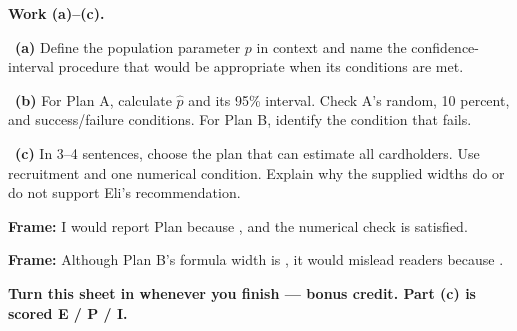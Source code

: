 \documentclass[11pt]{article}
\begin{document}
\newpage
\textbf{Work (a)--(c).}\par\smallskip

~\textbf{(a)} Define the population parameter $p$ in context and name the confidence-interval procedure that would be appropriate when its conditions are met.\par
\workspace{0.7in}

~\textbf{(b)} For Plan A, calculate $\hat p$ and its 95\% interval. Check A's random, 10 percent, and success/failure conditions. For Plan B, identify the condition that fails.\par
\workspace{1.4in}

~\textbf{(c)} In 3--4 sentences, choose the plan that can estimate all cardholders. Use recruitment and one numerical condition. Explain why the supplied widths do or do not support Eli's recommendation.\par
\workspace{2.0in}

\begin{sentenceframebox}\raggedright\textbf{Frame:} I would report Plan \blank[0.35in] because \blank[2.7in], and the numerical check \blank[1.6in] is satisfied.\end{sentenceframebox}

\begin{sentenceframebox}\raggedright\textbf{Frame:} Although Plan B's formula width is \blank[0.8in], it would mislead readers because \blank[2.8in].\end{sentenceframebox}

\textbf{Turn this sheet in whenever you finish --- bonus credit. Part (c) is scored E / P / I.}\par
\end{document}
